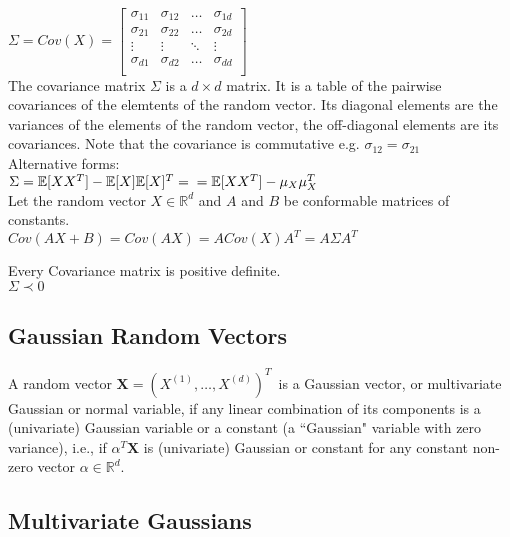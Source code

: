 $\Sigma = Cov (X) = \begin{bmatrix}
\sigma_{11} & \sigma_{12} &\ldots & \sigma_{1d} \\
\sigma_{21} & \sigma_{22} &\ldots & \sigma_{2d} \\
\vdots & \vdots &\ddots & \vdots \\
\sigma_{d1} & \sigma_{d2} &\ldots & \sigma_{dd} \\

\end{bmatrix}$\\

The covariance matrix $\Sigma$ is a $d \times d$ matrix. It is a table of the pairwise covariances of the elemtents of the random vector. Its diagonal elements are the variances of the elements of the random vector, the off-diagonal elements are its covariances. Note that the covariance is commutative e.g. $\sigma_{12} = \sigma_{21}$ \\

Alternative forms:\\

$\Sigma = \mathbb {E}[XX^ T] - \mathbb {E}[X]\mathbb {E}[X]^ T =\\ = \mathbb {E}[XX^ T] - \mu _{X}\mu _{X}^ T$\\

Let the random vector $X \in \mathbb{R}^d$ and $A$ and $B$ be conformable matrices of constants.\\

$Cov(AX + B) = Cov(AX) = A Cov(X) A^T = A \Sigma A^T$

Every Covariance matrix is positive definite.\\

$\Sigma \prec 0$\\

\subsection*{Gaussian Random Vectors}


A random vector $\mathbf{X}=(X^{(1)},\ldots ,X^{(d)})^ T\,$ is a Gaussian vector, or multivariate Gaussian or normal variable, if any linear combination of its components is a (univariate) Gaussian variable or a constant (a “Gaussian" variable with zero variance), i.e., if $\alpha ^ T \mathbf{X}$ is (univariate) Gaussian or constant for any constant non-zero vector $\alpha \in \mathbb {R}^ d$.

\subsection*{Multivariate Gaussians}

